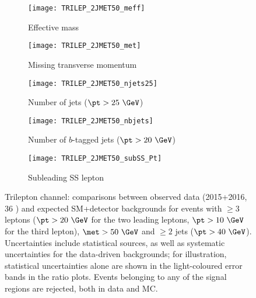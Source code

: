 \begin{figure}[t!]
\centering
\begin{subfigure}[t]{0.48\textwidth}
\texttt{[image: TRILEP\_2JMET50\_meff]}
\caption{Effective mass \meff}
\end{subfigure}
\begin{subfigure}[t]{0.48\textwidth}
\texttt{[image: TRILEP\_2JMET50\_met]}
\caption{Missing transverse momentum \met}
\end{subfigure}
\begin{subfigure}[t]{0.48\textwidth}
\texttt{[image: TRILEP\_2JMET50\_njets25]}
\caption{Number of jets ($\pt>25~\GeV$)}
\end{subfigure}
\begin{subfigure}[t]{0.48\textwidth}
\texttt{[image: TRILEP\_2JMET50\_nbjets]}
\caption{Number of $b$-tagged jets ($\pt>20~\GeV$)}
\end{subfigure}
\begin{subfigure}[t]{0.48\textwidth}
\texttt{[image: TRILEP\_2JMET50\_subSS\_Pt]}
\caption{Subleading SS lepton \pt}
\end{subfigure}
\caption{Trilepton channel: comparisons between observed data (2015+2016, 36 \ifb) and expected SM+detector backgrounds 
for events with $\ge 3$ leptons ($\pt>20~\GeV$ for the two leading leptons, $\pt>10~\GeV$ for the third lepton), $\met>50~\GeV$ and $\ge 2$ jets ($\pt>40~\GeV$). 
Uncertainties include statistical sources, as well as systematic uncertainties for the data-driven backgrounds; 
for illustration, statistical uncertainties alone are shown in the light-coloured error bands in the ratio plots. 
Events belonging to any of the signal regions are rejected, both in data and MC.  
}
\label{fig:distributions_channel3L_2015}
\end{figure} 
